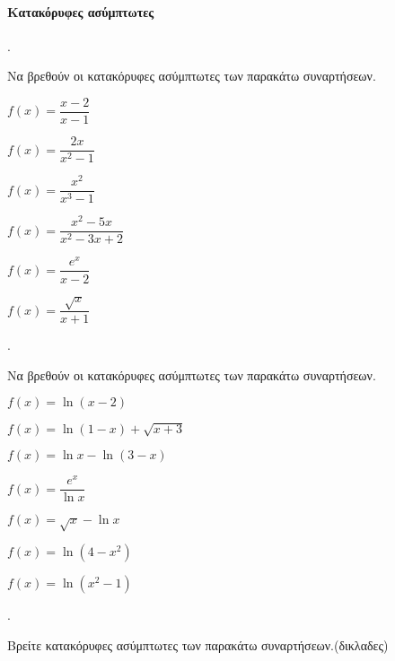 \documentclass[11pt,a4paper,twocolumn]{article}
\newcounter{askhsh}
\newcommand{\askhsh}{\large\theaskhsh.\ \addtocounter{askhsh}{1}}
\begin{document}
\paragraph{Κατακόρυφες ασύμπτωτες}
\askhsh Να βρεθούν οι κατακόρυφες ασύμπτωτες των παρακάτω συναρτήσεων.
\begin{multicols}{2}
\begin{alist}
\item $f(x)=\dfrac{x-2}{x-1}$
\item $f(x)=\dfrac{2x}{x^2-1}$
\item $f(x)=\dfrac{x^2}{x^3-1}$
\item $f(x)=\dfrac{x^2-5x}{x^2-3x+2}$
\item $f(x)=\dfrac{e^x}{x-2}$
\item $f(x)=\dfrac{\sqrt{x}}{x+1}$
\end{alist}
\end{multicols}
\askhsh Να βρεθούν οι κατακόρυφες ασύμπτωτες των παρακάτω συναρτήσεων.
\begin{alist}
\item $f(x)=\ln{(x-2)}$
\item $f(x)=\ln{(1-x)}+\sqrt{x+3}$
\item $f(x)=\ln{x}-\ln{(3-x)}$
\begin{multicols}{2}
\item $f(x)=\dfrac{e^x}{\ln{x}}$
\item $f(x)=\sqrt{x}-\ln{x}$
\item $f(x)=\ln{\left(4-x^2\right)}$
\item $f(x)=\ln{\left(x^2-1\right)}$
\end{multicols}
\end{alist}
\askhsh Βρείτε κατακόρυφες ασύμπτωτες των παρακάτω συναρτήσεων.(δικλαδες)
\end{document}
